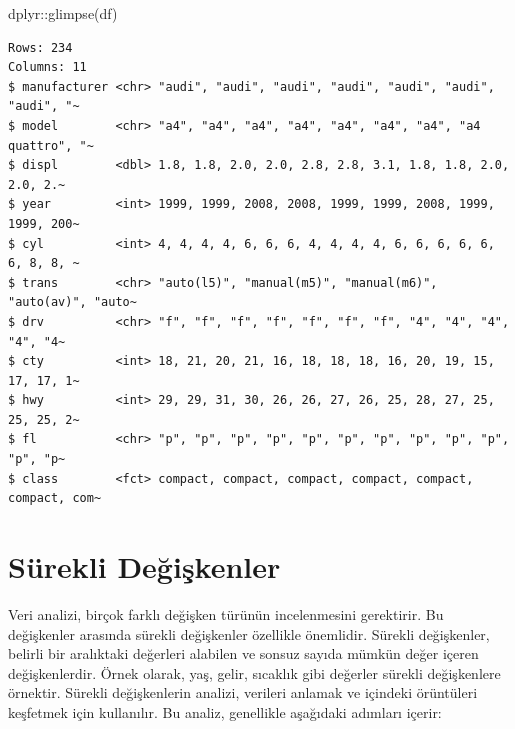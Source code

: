 \documentclass[
  letterpaper,
  DIV=11,
  numbers=noendperiod]{scrreprt}
\newenvironment{Shaded}{\begin{snugshade}}{\end{snugshade}}
\newcommand{\FunctionTok}[1]{\textcolor[rgb]{0.28,0.35,0.67}{#1}}
\newcommand{\NormalTok}[1]{\textcolor[rgb]{0.00,0.23,0.31}{#1}}
\newcommand{\SpecialCharTok}[1]{\textcolor[rgb]{0.37,0.37,0.37}{#1}}
\begin{document}
\begin{Shaded}
\begin{Highlighting}[]
\NormalTok{dplyr}\SpecialCharTok{::}\FunctionTok{glimpse}\NormalTok{(df)}
\end{Highlighting}
\end{Shaded}

\begin{verbatim}
Rows: 234
Columns: 11
$ manufacturer <chr> "audi", "audi", "audi", "audi", "audi", "audi", "audi", "~
$ model        <chr> "a4", "a4", "a4", "a4", "a4", "a4", "a4", "a4 quattro", "~
$ displ        <dbl> 1.8, 1.8, 2.0, 2.0, 2.8, 2.8, 3.1, 1.8, 1.8, 2.0, 2.0, 2.~
$ year         <int> 1999, 1999, 2008, 2008, 1999, 1999, 2008, 1999, 1999, 200~
$ cyl          <int> 4, 4, 4, 4, 6, 6, 6, 4, 4, 4, 4, 6, 6, 6, 6, 6, 6, 8, 8, ~
$ trans        <chr> "auto(l5)", "manual(m5)", "manual(m6)", "auto(av)", "auto~
$ drv          <chr> "f", "f", "f", "f", "f", "f", "f", "4", "4", "4", "4", "4~
$ cty          <int> 18, 21, 20, 21, 16, 18, 18, 18, 16, 20, 19, 15, 17, 17, 1~
$ hwy          <int> 29, 29, 31, 30, 26, 26, 27, 26, 25, 28, 27, 25, 25, 25, 2~
$ fl           <chr> "p", "p", "p", "p", "p", "p", "p", "p", "p", "p", "p", "p~
$ class        <fct> compact, compact, compact, compact, compact, compact, com~
\end{verbatim}

\hypertarget{suxfcrekli-deux11fiux15fkenler}{%
\section*{Sürekli Değişkenler}\label{suxfcrekli-deux11fiux15fkenler}}


Veri analizi, birçok farklı değişken türünün incelenmesini gerektirir.
Bu değişkenler arasında sürekli değişkenler özellikle önemlidir. Sürekli
değişkenler, belirli bir aralıktaki değerleri alabilen ve sonsuz sayıda
mümkün değer içeren değişkenlerdir. Örnek olarak, yaş, gelir, sıcaklık
gibi değerler sürekli değişkenlere örnektir. Sürekli değişkenlerin
analizi, verileri anlamak ve içindeki örüntüleri keşfetmek için
kullanılır. Bu analiz, genellikle aşağıdaki adımları içerir:
\end{document}

